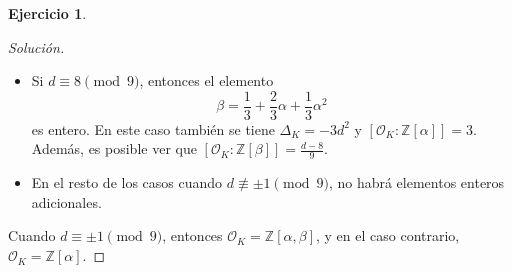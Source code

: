 \documentclass{article}
\newcounter{tarea}
\theoremstyle{definition}
\newtheorem{ejercicio}{Ejercicio}[tarea]
\newenvironment{solucion}{\begin{proof}[Solución]}{\end{proof}}
\newcommand{\ZZ}{\mathbb{Z}}
\renewcommand{\O}{\mathcal{O}}
\begin{document}
\begin{ejercicio}
\begin{solucion}
\begin{itemize}
    \item Si $d \equiv 8 \pmod{9}$, entonces el elemento
      $$\beta = \frac{1}{3} + \frac{2}{3}\alpha + \frac{1}{3}\alpha^2$$
      es entero. En este caso también se tiene $\Delta_K = -3d^2$ y
      $[\O_K : \ZZ [\alpha]] = 3$. Además, es posible ver que
      $[\O_K : \ZZ [\beta]] = \frac{d-8}{9}$.

    \item En el resto de los casos cuando $d \not\equiv \pm 1\pmod{9}$, no habrá
      elementos enteros adicionales.
    \end{itemize}

    Cuando $d \equiv\pm 1 \pmod{9}$, entonces $\O_K = \ZZ [\alpha,\beta]$,
    y en el caso contrario, $\O_K = \ZZ [\alpha]$.
  \end{solucion}
  \fi
\end{ejercicio}
\end{document}
